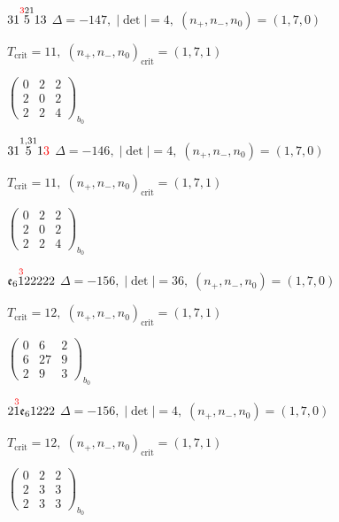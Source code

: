 \documentclass[10pt]{article}
\begin{document}
$31\overset{\textcolor{red}{3}21}{5}13$ \quad $\Delta=-147,\; |\det|=4,\; (n_+,n_-,n_0)=(1,7,0)$

\hspace{1em}$T_{\text{crit}}=11,\; (n_+,n_-,n_0)_{\text{crit}}=(1,7,1)$

\hspace{2em}$\left(\begin{smallmatrix}0 & 2 & 2 \\ 2 & 0 & 2 \\ 2 & 2 & 4\end{smallmatrix}\right)_{\!b_0}$

\smallskip

$31\overset{1,31}{5}1\textcolor{red}{3}$ \quad $\Delta=-146,\; |\det|=4,\; (n_+,n_-,n_0)=(1,7,0)$

\hspace{1em}$T_{\text{crit}}=11,\; (n_+,n_-,n_0)_{\text{crit}}=(1,7,1)$

\hspace{2em}$\left(\begin{smallmatrix}0 & 2 & 2 \\ 2 & 0 & 2 \\ 2 & 2 & 4\end{smallmatrix}\right)_{\!b_0}$

\smallskip

$\mathfrak{e}_6\overset{\textcolor{red}{3}}{1}22222$ \quad $\Delta=-156,\; |\det|=36,\; (n_+,n_-,n_0)=(1,7,0)$

\hspace{1em}$T_{\text{crit}}=12,\; (n_+,n_-,n_0)_{\text{crit}}=(1,7,1)$

\hspace{2em}$\left(\begin{smallmatrix}0 & 6 & 2 \\ 6 & 27 & 9 \\ 2 & 9 & 3\end{smallmatrix}\right)_{\!b_0}$

\smallskip

$2\overset{\textcolor{red}{3}}{1}\mathfrak{e}_61222$ \quad $\Delta=-156,\; |\det|=4,\; (n_+,n_-,n_0)=(1,7,0)$

\hspace{1em}$T_{\text{crit}}=12,\; (n_+,n_-,n_0)_{\text{crit}}=(1,7,1)$

\hspace{2em}$\left(\begin{smallmatrix}0 & 2 & 2 \\ 2 & 3 & 3 \\ 2 & 3 & 3\end{smallmatrix}\right)_{\!b_0}$
\end{document}
